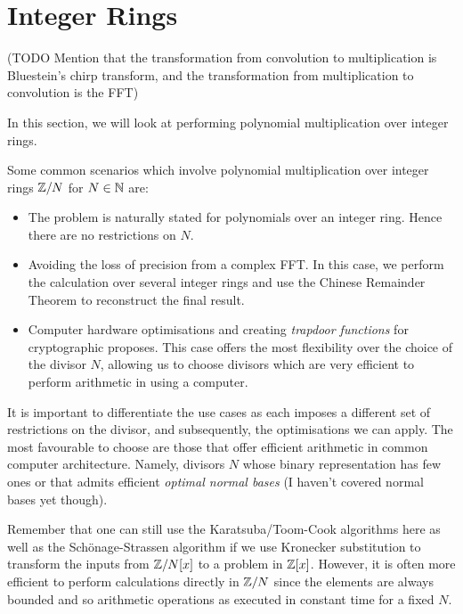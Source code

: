 \chapter{Integer Rings}\label{chp:integer-rings}

(TODO Mention that the transformation from convolution to multiplication is Bluestein's chirp transform, and the transformation from multiplication to convolution is the FFT)

In this section, we will look at performing polynomial multiplication over integer rings.

Some common scenarios which involve polynomial multiplication over integer rings ${\mathbb Z}/N$ for $N \in {\mathbb N}$ are:
\begin{itemize}
    \item The problem is naturally stated for polynomials over an integer ring. Hence there are no restrictions on $N$.
    \item Avoiding the loss of precision from a complex FFT. In this case, we perform the calculation over several integer rings and use the Chinese Remainder Theorem to reconstruct the final result.
    \item Computer hardware optimisations and creating \emph{trapdoor functions} for cryptographic proposes. This case offers the most flexibility over the choice of the divisor $N$, allowing us to choose divisors which are very efficient to perform arithmetic in using a computer.
\end{itemize}

It is important to differentiate the use cases as each imposes a different set of restrictions on the divisor, and subsequently, the optimisations we can apply. The most favourable to choose are those that offer efficient arithmetic in common computer architecture. Namely, divisors $N$ whose binary representation has few ones or that admits efficient \emph{optimal normal bases} (I haven't covered normal bases yet though).

Remember that one can still use the Karatsuba/Toom-Cook algorithms here as well as the Sch\"{o}nage-Strassen algorithm if we use Kronecker substitution to transform the inputs from ${\mathbb Z}/N[x]$ to a problem in ${\mathbb Z}[x]$. However, it is often more efficient to perform calculations directly in ${\mathbb Z}/N$ since the elements are always bounded and so arithmetic operations as executed in constant time for a fixed $N$.


